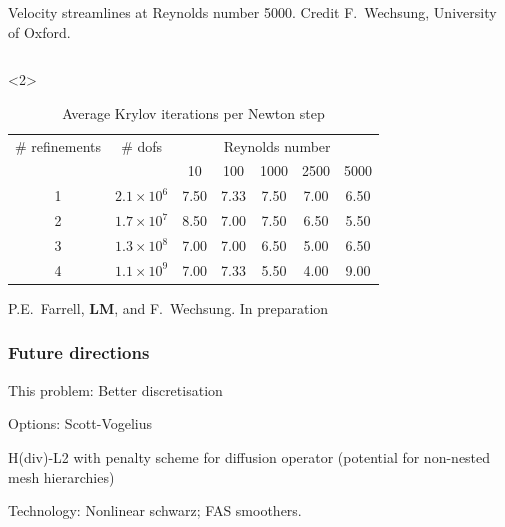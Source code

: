 \documentclass[presentation]{beamer}
\begin{document}
\begin{frame}
\begin{onlyenv}
\begin{columns}
\begin{column}{0.48\textwidth}
\begin{center}
          {\tiny Velocity streamlines at Reynolds number 5000.
            Credit F.~Wechsung, University of Oxford.}
        \end{center}
      \end{column}
    \end{columns}
  \end{onlyenv}
  \begin{onlyenv}<2>
    \begin{table}
      \centering
      \begin{tabular}{cc|ccccc}
        \toprule
        \# refinements & \# dofs & \multicolumn{5}{c}{Reynolds number} \\
                       && 10 & 100 & 1000 & 2500 & 5000 \\
        \midrule
        1 & $2.1 \times 10^6$ & 7.50 & 7.33 & 7.50 & 7.00 & 6.50 \\
        2 & $1.7 \times 10^7$ & 8.50 & 7.00 & 7.50 & 6.50 & 5.50 \\
        3 & $1.3 \times 10^8$ & 7.00 & 7.00 & 6.50 & 5.00 & 6.50 \\
        4 & $1.1 \times 10^9$ & 7.00 & 7.33 & 5.50 & 4.00 & 9.00 \\
        \bottomrule
      \end{tabular}
      \caption{Average Krylov iterations per Newton step}
    \end{table}
  \end{onlyenv}
  \begin{flushright}
    {\scriptsize P.E.~Farrell, \textbf{LM}, and F.~Wechsung. In preparation}
  \end{flushright}
\end{frame}

\begin{frame}
  \frametitle{Future directions}

  This problem:
  Better discretisation

  Options: Scott-Vogelius

  H(div)-L2 with penalty scheme for diffusion operator (potential for
  non-nested mesh hierarchies)

  Technology:
  Nonlinear schwarz; FAS smoothers.
\end{frame}
\end{document}
